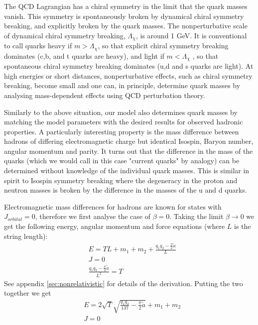 \documentclass[11pt,a4paper]{article}
\begin{document}
The QCD Lagrangian has a chiral symmetry in the limit that the quark masses vanish. This symmetry is spontaneously broken by dynamical chiral symmetry breaking, and explicitly broken by the quark masses. The nonperturbative scale of dynamical chiral symmetry breaking, $\Lambda_{\chi}$, is around 1 GeV. It is conventional to call quarks heavy if $m>\Lambda_{\chi}$, so that explicit chiral symmetry breaking dominates (c,b, and t quarks are heavy), and light if $m<\Lambda_{\chi}$ , so that spontaneous chiral symmetry breaking dominates (u,d and s quarks are light). At high energies or short distances, nonperturbative effects, such as chiral symmetry breaking, become small and one can, in principle, determine quark masses by analysing mass-dependent effects using QCD perturbation theory.

Similarly to the above situation, our model also determines quark masses by matching the model parameters with the desired results for observed hadronic properties. A particularly interesting property is the mass difference between hadrons of differing electromagnetic charge but identical Isospin, Baryon number, angular momentum and parity. It turns out that the difference in the mass of the quarks (which we would call in this case "current quarks" by analogy) can be determined without knowledge of the individual quark masses. This is similar in spirit to Isospin symmetry breaking where the degeneracy in the proton and neutron masses is broken by the difference in the masses of the u and d quarks.

Electromagnetic mass differences for hadrons are known for states with $J_{orbital}=0$, therefore we first analyse the case of $\beta=0$.
Taking the limit $\beta\rightarrow0$ we get the following energy, angular momentum and force equations (where $L$ is the string length):
\begin{subequations}
\label{eq:nonrelativistic}
\begin{align}
&E=TL+m_{1}+m_{2}+\frac{q_1q_2-\frac{\pi}{2}\tilde{a}}{L}\\ 
&J=0\\
&\frac{q_1q_2-\frac{\pi}{2}\tilde{a}}{L^{2}}=T
\end{align}
\end{subequations}
See appendix \ref{sec:nonrelativistic} for details of the derivation.
Putting the two together we get
\begin{align}
&E=2\sqrt{T}\sqrt{\frac{q_1q_2}{137}-\frac{\pi}{2}\tilde{a}}+m_{1}+m_{2} \\
&J=0
\label{eq:nonrelativistic2}
\end{align}
\end{document}
